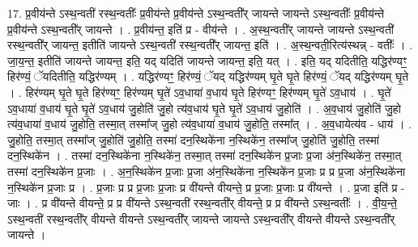 \documentclass[17pt]{extarticle}
\begin{document}
17. प्र॒वीय॑न्ते ऽस्थ॒न्वती॑ रस्थ॒न्वतीः᳚ प्र॒वीय॑न्ते प्र॒वीय॑न्ते ऽस्थ॒न्वती᳚र् जायन्ते जायन्ते ऽस्थ॒न्वतीः᳚ प्र॒वीय॑न्ते प्र॒वीय॑न्ते ऽस्थ॒न्वती᳚र् जायन्ते । . प्र॒वीय॑न्त॒ इति॑ प्र - वीय॑न्ते । . अ॒स्थ॒न्वती᳚र् जायन्ते जायन्ते ऽस्थ॒न्वती॑ रस्थ॒न्वती᳚र् जायन्त॒ इतीति॑ जायन्ते ऽस्थ॒न्वती॑ रस्थ॒न्वती᳚र् जायन्त॒ इति॑ । . अ॒स्थ॒न्वती॒रित्य॑स्थन्न् - वतीः᳚ । . जा॒य॒न्त॒ इतीति॑ जायन्ते जायन्त॒ इति॒ यद् यदिति॑ जायन्ते जायन्त॒ इति॒ यत् । . इति॒ यद् यदितीति॒ यद्धिर॑ण्यꣳ॒॒ हिर॑ण्यं॒ ॅयदितीति॒ यद्धिर॑ण्यम् । . यद्धिर॑ण्यꣳ॒॒ हिर॑ण्यं॒ ॅयद् यद्धिर॑ण्यम् घृ॒ते घृ॒ते हिर॑ण्यं॒ ॅयद् यद्धिर॑ण्यम् घृ॒ते । . हिर॑ण्यम् घृ॒ते घृ॒ते हिर॑ण्यꣳ॒॒ हिर॑ण्यम् घृ॒ते॑ ऽव॒धाया॑ व॒धाय॑ घृ॒ते हिर॑ण्यꣳ॒॒ हिर॑ण्यम् घृ॒ते॑ ऽव॒धाय॑ । . घृ॒ते॑ ऽव॒धाया॑ व॒धाय॑ घृ॒ते घृ॒ते॑ ऽव॒धाय॑ जु॒होति॑ जु॒हो त्य॑व॒धाय॑ घृ॒ते घृ॒ते॑ ऽव॒धाय॑ जु॒होति॑ । . अ॒व॒धाय॑ जु॒होति॑ जु॒हो त्य॑व॒धाया॑ व॒धाय॑ जु॒होति॒ तस्मा॒त् तस्मा᳚ज् जु॒हो त्य॑व॒धाया॑ व॒धाय॑ जु॒होति॒ तस्मा᳚त् । . अ॒व॒धायेत्य॑व - धाय॑ । . जु॒होति॒ तस्मा॒त् तस्मा᳚ज् जु॒होति॑ जु॒होति॒ तस्मा॑ दन॒स्थिके॑ना न॒स्थिके॑न॒ तस्मा᳚ज् जु॒होति॑ जु॒होति॒ तस्मा॑ दन॒स्थिके॑न । . तस्मा॑ दन॒स्थिके॑ना न॒स्थिके॑न॒ तस्मा॒त् तस्मा॑ दन॒स्थिके॑न प्र॒जाः प्र॒जा अ॑न॒स्थिके॑न॒ तस्मा॒त् तस्मा॑ दन॒स्थिके॑न प्र॒जाः । . अ॒न॒स्थिके॑न प्र॒जाः प्र॒जा अ॑न॒स्थिके॑ना न॒स्थिके॑न प्र॒जाः प्र प्र प्र॒जा अ॑न॒स्थिके॑ना न॒स्थिके॑न प्र॒जाः प्र । . प्र॒जाः प्र प्र प्र॒जाः प्र॒जाः प्र वी॑यन्ते वीयन्ते॒ प्र प्र॒जाः प्र॒जाः प्र वी॑यन्ते । . प्र॒जा इति॑ प्र - जाः । . प्र वी॑यन्ते वीयन्ते॒ प्र प्र वी॑यन्ते ऽस्थ॒न्वती॑ रस्थ॒न्वती᳚र् वीयन्ते॒ प्र प्र वी॑यन्ते ऽस्थ॒न्वतीः᳚ । . वी॒य॒न्ते॒ ऽस्थ॒न्वती॑ रस्थ॒न्वती᳚र् वीयन्ते वीयन्ते ऽस्थ॒न्वती᳚र् जायन्ते जायन्ते ऽस्थ॒न्वती᳚र् वीयन्ते वीयन्ते ऽस्थ॒न्वती᳚र् जायन्ते । \newline
\end{document}
